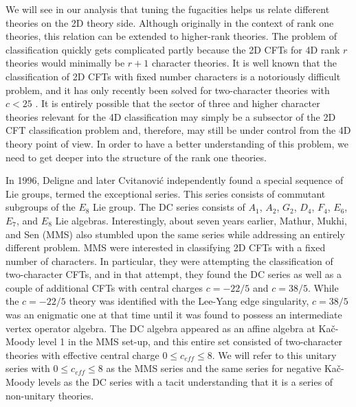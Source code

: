 \documentclass[a4paper,12pt]{article}
\begin{document}
We will see in our analysis that tuning the fugacities helps us relate different theories on the 2D theory side. Although originally in the context of rank one theories, this relation can be extended to higher-rank theories.
The problem of classification quickly gets complicated partly because the 2D CFTs for 4D rank $r$ theories would minimally be $r+1$ character theories. It is well known that the classification of 2D CFTs with fixed number characters is a notoriously difficult problem, and it has only recently been solved for two-character theories with $c<25$ \cite{Mukhi:2022bte}. It is entirely possible that the sector of three and higher character theories relevant for the 4D classification may simply be a subsector of the 2D CFT classification problem and, therefore, may still be under control from the 4D theory point of view. In order to have a better understanding of this problem, we need to get deeper into the structure of the rank one theories.

In 1996, Deligne and later Cvitanovi\'c independently found a special sequence of Lie groups, termed the exceptional series.
This series consists of commutant subgroups of the $E_8$ Lie group. The DC series consists of $A_1$, $A_2$, $G_2$, $D_4$, $F_4$, $E_6$, $E_7$, and $E_8$ Lie algebras. Interestingly, about seven years earlier, Mathur, Mukhi, and Sen (MMS) \cite{Mathur:1988gt,Mathur:1988na,Mathur:1988rx} also stumbled upon the same series while addressing an entirely different problem. MMS were interested in classifying 2D CFTs with a fixed number of characters. In particular, they were attempting the classification of two-character CFTs, and in that attempt, they found the DC series as well as a couple of additional CFTs with central charges $c=-22/5$ and $c=38/5$.  While the $c=-22/5$ theory was identified with the Lee-Yang edge singularity, $c=38/5$ was an enigmatic one at that time until it was found to possess an intermediate vertex operator algebra\cite{LANDSBERG2006143,Lee:2023owa}. The DC algebra appeared as an affine algebra at Ka\v c-Moody level 1 in the MMS set-up, and this entire set consisted of two-character theories with effective central charge $0\leq c_{eff}\leq 8$. We will refer to this unitary series with $0\leq c_{eff}\leq 8$ as the MMS series and the same series for negative Ka\v c-Moody levels as the DC series with a tacit understanding that it is a series of non-unitary theories.
\end{document}
